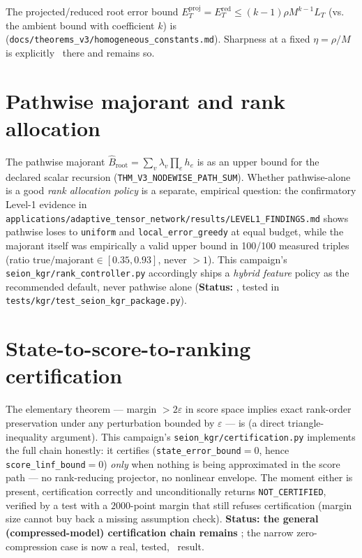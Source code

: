 \documentclass[11pt]{article}
\begin{document}
The projected/reduced root error bound
$E_T^{\mathrm{proj}} = E_T^{\mathrm{red}} \le (k-1)\rho M^{k-1} L_T$ (vs. the ambient bound with
coefficient $k$) is \textbf{\ProvedU} (\texttt{docs/theorems\_v3/homogeneous\_constants.md}).
Sharpness at a fixed $\eta = \rho/M$ is explicitly \OpenC\ there and remains so.

\section{Pathwise majorant and rank allocation}
The pathwise majorant $\widehat B_{\text{root}} = \sum_v \lambda_v \prod_{e} h_e$ is
\textbf{\ProvedU} as an upper bound for the declared scalar recursion
(\texttt{THM\_V3\_NODEWISE\_PATH\_SUM}). Whether pathwise-alone is a good \emph{rank allocation
policy} is a separate, empirical question: the confirmatory Level-1 evidence in
\texttt{applications/adaptive\_tensor\_network/results/LEVEL1\_FINDINGS.md} shows pathwise loses
to \texttt{uniform} and \texttt{local\_error\_greedy} at equal budget, while the majorant itself
was empirically a valid upper bound in 100/100 measured triples (ratio
$\mathrm{true}/\mathrm{majorant} \in [0.35,0.93]$, never $>1$). This campaign's
\texttt{seion\_kgr/rank\_controller.py} accordingly ships a \emph{hybrid feature} policy as the
recommended default, never pathwise alone (\textbf{Status: \DefC}, tested in
\texttt{tests/kgr/test\_seion\_kgr\_package.py}).

\section{State-to-score-to-ranking certification}
\label{sec:cert}
The elementary theorem --- margin $> 2\varepsilon$ in score space implies exact rank-order
preservation under any perturbation bounded by $\varepsilon$ --- is \textbf{\Proved} (a direct
triangle-inequality argument). This campaign's \texttt{seion\_kgr/certification.py} implements
the full chain honestly: it certifies (\texttt{state\_error\_bound}$=0$, hence
\texttt{score\_linf\_bound}$=0$) \emph{only} when nothing is being approximated in the score path
--- no rank-reducing projector, no nonlinear envelope. The moment either is present, certification
correctly and unconditionally returns \texttt{NOT\_CERTIFIED}, verified by a test with a
$2000$-point margin that still refuses certification (margin size cannot buy back a missing
assumption check). \textbf{Status: the general (compressed-model) certification chain remains
\OpenC}; the narrow zero-compression case is now a real, tested, \ProvedU\ result.
\end{document}
